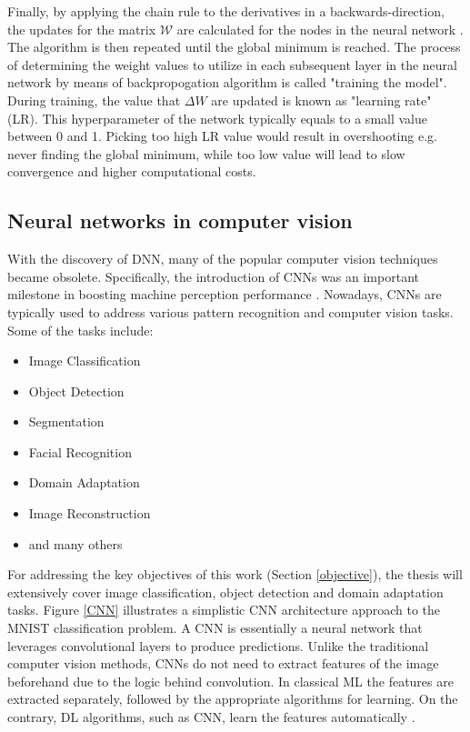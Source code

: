 Finally, by applying the chain rule to the derivatives in a backwards-direction, the updates for the matrix $\mathcal{W}$ are calculated for the nodes in the neural network \cite{Alber2018}. The algorithm is then repeated until the global minimum is reached. The process of determining the weight values to utilize in each subsequent layer in the neural network by means of backpropogation algorithm is called "training the model". During training, the value that $\Delta W$ are updated is known as "learning rate" (LR). This hyperparameter of the network typically equals to a small value between 0 and 1. Picking too high LR value would result in overshooting e.g. never finding the global minimum, while too low value will lead to slow convergence and higher computational costs. 


\subsection{Neural networks in computer vision}
\label{neural_nets} 
With the discovery of DNN, many of the popular computer vision techniques became obsolete. Specifically, the introduction of CNNs was an important milestone in boosting machine perception performance \cite{Mahony2019}. Nowadays, CNNs are typically used to address various pattern recognition and computer vision tasks. Some of the tasks  include:

\begin{itemize}
	\item Image Classification
	\item Object Detection
	\item Segmentation
	\item Facial Recognition
	\item Domain Adaptation
	\item Image Reconstruction
	\item and many others \cite{paperswithcode:2022}
\end{itemize}

For addressing the key objectives of this work (Section \ref{objective}), the thesis will extensively cover image classification, object detection and domain adaptation tasks. Figure \ref{CNN} illustrates a simplistic CNN architecture approach to the MNIST  \cite{lecun-mnisthandwrittendigit-2010} classification problem. A CNN is essentially a neural network that leverages convolutional layers to produce predictions. Unlike the traditional computer vision methods, CNNs do not need to extract features of the image beforehand due to the logic behind convolution. In classical ML the features are extracted separately, followed by the appropriate algorithms for learning. On the contrary, DL algorithms, such as CNN, learn the features automatically \cite{alom01}.


